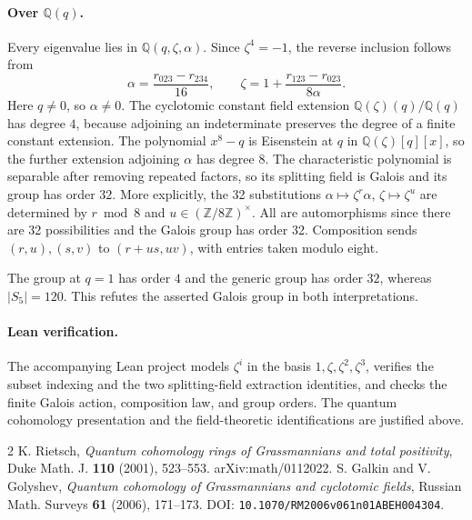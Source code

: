 \documentclass[11pt]{article}
\begin{document}
\paragraph{Over \(\mathbb Q(q)\).}
Every eigenvalue lies in \(\mathbb Q(q,\zeta,\alpha)\). Since
\(\zeta^4=-1\), the reverse inclusion follows from
\[
 \alpha=\frac{r_{023}-r_{234}}{16},
 \qquad
 \zeta=1+\frac{r_{123}-r_{023}}{8\alpha}.
\]
Here \(q\ne0\), so \(\alpha\ne0\). The cyclotomic constant field
extension \(\mathbb Q(\zeta)(q)/\mathbb Q(q)\) has degree \(4\),
because adjoining an indeterminate preserves the degree of a finite
constant extension. The polynomial \(x^8-q\) is Eisenstein at \(q\)
in \(\mathbb Q(\zeta)[q][x]\), so the further extension adjoining
\(\alpha\) has degree \(8\). The characteristic polynomial is
separable after removing repeated factors, so its splitting field
is Galois and its group has order \(32\).
More explicitly, the 32 substitutions
\(\alpha\mapsto\zeta^r\alpha\), \(\zeta\mapsto\zeta^u\) are determined
by \(r\bmod8\) and \(u\in(\mathbb Z/8\mathbb Z)^\times\).
All are automorphisms since there are 32 possibilities and the
Galois group has order 32. Composition sends
\((r,u),(s,v)\) to \((r+us,uv)\), with entries taken modulo eight.

The group at \(q=1\) has order \(4\) and the generic group has order
\(32\), whereas \(\lvert S_5\rvert=120\). This refutes the asserted
Galois group in both interpretations.

\paragraph{Lean verification.}
The accompanying Lean project models \(\zeta^i\) in the basis
\(1,\zeta,\zeta^2,\zeta^3\), verifies the subset indexing and the two
splitting-field extraction identities, and checks the finite Galois
action, composition law, and group orders. The quantum cohomology
presentation and the field-theoretic identifications are justified
above.

\begin{thebibliography}{2}
K. Rietsch, \emph{Quantum cohomology rings of Grassmannians and total
positivity}, Duke Math. J. \textbf{110} (2001), 523--553.
arXiv:math/0112022.
S. Galkin and V. Golyshev, \emph{Quantum cohomology of Grassmannians
and cyclotomic fields}, Russian Math. Surveys \textbf{61} (2006),
171--173. DOI: \texttt{10.1070/RM2006v061n01ABEH004304}.
\end{thebibliography}
\end{document}
